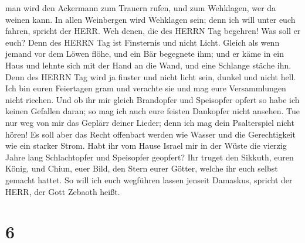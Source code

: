 man wird den Ackermann zum Trauern rufen, und zum Wehklagen, wer da
weinen kann.  In allen Weinbergen wird Wehklagen sein; denn
ich will unter euch fahren, spricht der HERR.  Weh denen,
die des HERRN Tag begehren! Was soll er euch? Denn des HERRN Tag ist
Finsternis und nicht Licht.  Gleich als wenn jemand vor dem
Löwen flöhe, und ein Bär begegnete ihm; und er käme in ein Haus und
lehnte sich mit der Hand an die Wand, und eine Schlange stäche ihn.
 Denn des HERRN Tag wird ja finster und nicht licht sein,
dunkel und nicht hell.  Ich bin euren Feiertagen gram und
verachte sie und mag eure Versammlungen nicht riechen.  Und
ob ihr mir gleich Brandopfer und Speisopfer opfert so habe ich keinen
Gefallen daran; so mag ich auch eure feisten Dankopfer nicht ansehen.
 Tue nur weg von mir das Geplärr deiner Lieder; denn ich
mag dein Psalterspiel nicht hören!  Es soll aber das Recht
offenbart werden wie Wasser und die Gerechtigkeit wie ein starker Strom.
 Habt ihr vom Hause Israel mir in der Wüste die vierzig
Jahre lang Schlachtopfer und Speisopfer geopfert?  Ihr
truget den Sikkuth, euren König, und Chiun, euer Bild, den Stern eurer
Götter, welche ihr euch selbst gemacht hattet.  So will ich
euch wegführen lassen jenseit Damaskus, spricht der HERR, der Gott
Zebaoth heißt.

\hypertarget{section-5}{%
\section{6}\label{section-5}}


